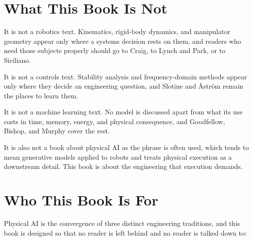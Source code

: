 \documentclass[
  9pt,
  letterpaper,
  open=right,
  numbers=noenddot,
  captions=tableheading]{scrbook}
\makeatletter
\newif\ifmlsys@inside@longtable
\newif\ifmlsys@longtable@numbered
\let\mlsys@orig@label\label
\renewcommand{\label}[1]{%
  \ifmlsys@inside@longtable
    \global\mlsys@longtable@numberedtrue
  \fi
  \mlsys@orig@label{#1}%
}
\let\label\mlsys@orig@label
\makeatother
\begin{document}
\section*{What This Book Is Not}\label{what-this-book-is-not}


It is not a robotics text. Kinematics, rigid-body dynamics, and
manipulator geometry appear only where a systems decision rests on them,
and readers who need those subjects properly should go to Craig, to
Lynch and Park, or to Siciliano.

It is not a controls text. Stability analysis and frequency-domain
methods appear only where they decide an engineering question, and
Slotine and Åström remain the places to learn them.

It is not a machine learning text. No model is discussed apart from what
its use costs in time, memory, energy, and physical consequence, and
Goodfellow, Bishop, and Murphy cover the rest.

It is also not a book about physical AI as the phrase is often used,
which tends to mean generative models applied to robots and treats
physical execution as a downstream detail. This book is about the
engineering that execution demands.

\section*{Who This Book Is For}\label{who-this-book-is-for}


Physical AI is the convergence of three distinct engineering traditions,
and this book is designed so that no reader is left behind and no reader
is talked down to:
\end{document}

